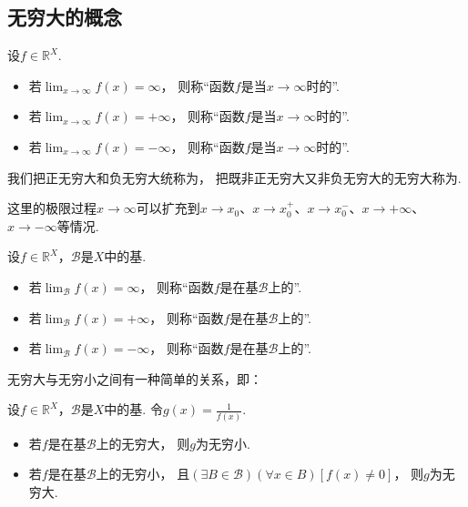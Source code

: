\subsection{无穷大的概念}
\begin{definition}
设\(f\in\mathbb{R}^X\).
\begin{itemize}
	\item 若\(\lim_{x\to\infty} f(x) = \infty\)，
	则称“函数\(f\)是当\(x\to\infty\)时的”.

	\item 若\(\lim_{x\to\infty} f(x) = +\infty\)，
	则称“函数\(f\)是当\(x\to\infty\)时的”.

	\item 若\(\lim_{x\to\infty} f(x) = -\infty\)，
	则称“函数\(f\)是当\(x\to\infty\)时的”.
\end{itemize}
我们把正无穷大和负无穷大统称为，
把既非正无穷大又非负无穷大的无穷大称为.
\end{definition}
这里的极限过程\(x \to \infty\)可以扩充到\(x \to x_0\)、\(x \to x_0^+\)、\(x \to x_0^-\)、\(x \to +\infty\)、\(x \to -\infty\)等情况.

\begin{definition}
设\(f\in\mathbb{R}^X\)，\(\mathcal{B}\)是\(X\)中的基.
\begin{itemize}
	\item 若\(\lim_\mathcal{B} f(x) = \infty\)，
	则称“函数\(f\)是在基\(\mathcal{B}\)上的”.

	\item 若\(\lim_\mathcal{B} f(x) = +\infty\)，
	则称“函数\(f\)是在基\(\mathcal{B}\)上的”.

	\item 若\(\lim_\mathcal{B} f(x) = -\infty\)，
	则称“函数\(f\)是在基\(\mathcal{B}\)上的”.
\end{itemize}
\end{definition}

无穷大与无穷小之间有一种简单的关系，即：
\begin{theorem}\label{theorem:极限.无穷大与无穷小的关系}
设\(f\in\mathbb{R}^X\)，\(\mathcal{B}\)是\(X\)中的基.
令\(g(x) = \frac1{f(x)}\).
\begin{itemize}
	\item 若\(f\)是在基\(\mathcal{B}\)上的无穷大，
	则\(g\)为无穷小.

	\item 若\(f\)是在基\(\mathcal{B}\)上的无穷小，
	且\((\exists B\in\mathcal{B})(\forall x\in B)[f(x) \neq 0]\)，
	则\(g\)为无穷大.
\end{itemize}
\end{theorem}

